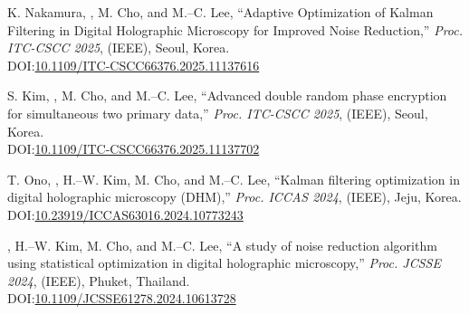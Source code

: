 \documentclass[a4paper,9pt]{extarticle}
\begin{document}
\begin{enumerate}[label={[\arabic*]}, start=1]
    \item 
    K. Nakamura, , M. Cho, and M.--C. Lee, 
    ``Adaptive Optimization of Kalman Filtering in Digital Holographic Microscopy for Improved Noise Reduction,'' 
    \textit{Proc. ITC-CSCC 2025}, (IEEE),
    Seoul, Korea. \\
    DOI:\href{https://doi.org/10.1109/ITC-CSCC66376.2025.11137616}{10.1109/ITC-CSCC66376.2025.11137616}
    
    \item 
    S. Kim, , M. Cho, and M.--C. Lee, 
    ``Advanced double random phase encryption for simultaneous two primary data,'' 
    \textit{Proc. ITC-CSCC 2025}, (IEEE),
    Seoul, Korea. \\
    DOI:\href{https://doi.org/10.1109/ITC-CSCC66376.2025.11137702}{10.1109/ITC-CSCC66376.2025.11137702}
    
    \item 
    T. Ono, , H.--W. Kim, M. Cho, and M.--C. Lee, 
    ``Kalman filtering optimization in digital holographic microscopy (DHM),'' 
    \textit{Proc. ICCAS 2024}, (IEEE),
    Jeju, Korea.\\
    DOI:\href{https://doi.org/10.23919/ICCAS63016.2024.10773243}{10.23919/ICCAS63016.2024.10773243} 
    
    \item 
    , H.--W. Kim, M. Cho, and M.--C. Lee, 
    ``A study of noise reduction algorithm using statistical optimization in digital holographic microscopy,'' 
    \textit{Proc. JCSSE 2024}, (IEEE),
    Phuket, Thailand.\\
    DOI:\href{https://doi.org/10.1109/JCSSE61278.2024.10613728}{10.1109/JCSSE61278.2024.10613728} 
    
    
\end{enumerate} 
\end{document}
